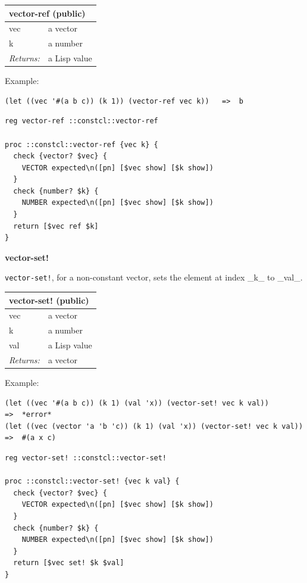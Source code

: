 \documentclass[twoside,9pt]{report}
\begin{document}
\begin{tabular}{ |l l| }
\hline
\multicolumn{2}{|l|}{vector-ref (public)} \\
\hline
vec & a vector \\
k & a number \\
\textit{Returns:} & a Lisp value \\
\hline
\end{tabular}


Example:

\noindent\makebox[\linewidth]{\rule{\linewidth}{0.4pt}}
\begin{lstlisting}
(let ((vec '#(a b c)) (k 1)) (vector-ref vec k))   =>  b
\end{lstlisting}
\noindent\makebox[\linewidth]{\rule{\linewidth}{0.4pt}}
\noindent\makebox[\linewidth]{\rule{\linewidth}{0.4pt}}
\begin{lstlisting}
reg vector-ref ::constcl::vector-ref
 
proc ::constcl::vector-ref {vec k} {
  check {vector? $vec} {
    VECTOR expected\n([pn] [$vec show] [$k show])
  }
  check {number? $k} {
    NUMBER expected\n([pn] [$vec show] [$k show])
  }
  return [$vec ref $k]
}
\end{lstlisting}
\noindent\makebox[\linewidth]{\rule{\linewidth}{0.4pt}}

\textbf{vector-set!}


\texttt{vector-set!}, for a non-constant vector, sets the element at index \_k\_ to \_val\_.

\begin{tabular}{ |l l| }
\hline
\multicolumn{2}{|l|}{vector-set! (public)} \\
\hline
vec & a vector \\
k & a number \\
val & a Lisp value \\
\textit{Returns:} & a vector \\
\hline
\end{tabular}


Example:

\noindent\makebox[\linewidth]{\rule{\linewidth}{0.4pt}}
\begin{lstlisting}
(let ((vec '#(a b c)) (k 1) (val 'x)) (vector-set! vec k val))           =>  *error*
(let ((vec (vector 'a 'b 'c)) (k 1) (val 'x)) (vector-set! vec k val))   =>  #(a x c)
\end{lstlisting}
\noindent\makebox[\linewidth]{\rule{\linewidth}{0.4pt}}
\noindent\makebox[\linewidth]{\rule{\linewidth}{0.4pt}}
\begin{lstlisting}
reg vector-set! ::constcl::vector-set!
 
proc ::constcl::vector-set! {vec k val} {
  check {vector? $vec} {
    VECTOR expected\n([pn] [$vec show] [$k show])
  }
  check {number? $k} {
    NUMBER expected\n([pn] [$vec show] [$k show])
  }
  return [$vec set! $k $val]
}
\end{lstlisting}
\noindent\makebox[\linewidth]{\rule{\linewidth}{0.4pt}}
\end{document}
